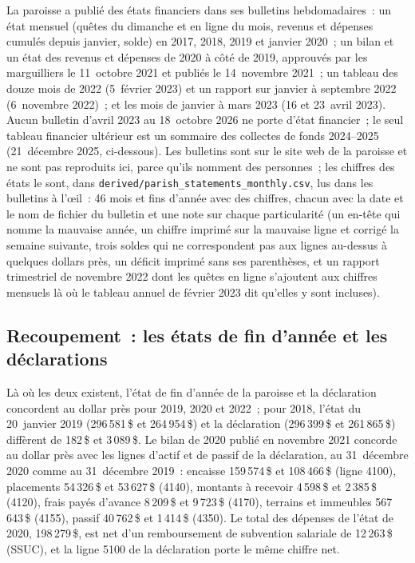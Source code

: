 \documentclass[11pt,letterpaper]{article}
\newcommand{\D}[1]{#1\,\$}
\begin{document}
La paroisse a publié des états financiers dans ses bulletins hebdomadaires~: un état mensuel (quêtes du dimanche et en ligne du mois, revenus et dépenses cumulés depuis janvier, solde) en 2017, 2018, 2019 et janvier 2020~; un bilan et un état des revenus et dépenses de 2020 à côté de 2019, approuvés par les marguilliers le 11~octobre 2021 et publiés le 14~novembre 2021~; un tableau des douze mois de 2022 (5~février 2023) et un rapport sur janvier à septembre 2022 (6~novembre 2022)~; et les mois de janvier à mars 2023 (16 et 23~avril 2023). Aucun bulletin d'avril 2023 au 18~octobre 2026 ne porte d'état financier~; le seul tableau financier ultérieur est un sommaire des collectes de fonds 2024--2025 (21~décembre 2025, ci-dessous). Les bulletins sont sur le site web de la paroisse et ne sont pas reproduits ici, parce qu'ils nomment des personnes~; les chiffres des états le sont, dans \texttt{derived/parish\_statements\_monthly.csv}, lus dans les bulletins à l'œil~: 46 mois et fins d'année avec des chiffres, chacun avec la date et le nom de fichier du bulletin et une note sur chaque particularité (un en-tête qui nomme la mauvaise année, un chiffre imprimé sur la mauvaise ligne et corrigé la semaine suivante, trois soldes qui ne correspondent pas aux lignes au-dessus à quelques dollars près, un déficit imprimé sans ses parenthèses, et un rapport trimestriel de novembre 2022 dont les quêtes en ligne s'ajoutent aux chiffres mensuels là où le tableau annuel de février 2023 dit qu'elles y sont incluses).

\subsection{Recoupement~: les états de fin d'année et les déclarations}

\begin{center}\small\end{center}

Là où les deux existent, l'état de fin d'année de la paroisse et la déclaration concordent au dollar près pour 2019, 2020 et 2022~; pour 2018, l'état du 20~janvier 2019 (\D{296\,581} et \D{264\,954}) et la déclaration (\D{296\,399} et \D{261\,865}) diffèrent de \D{182} et \D{3\,089}. Le bilan de 2020 publié en novembre 2021 concorde au dollar près avec les lignes d'actif et de passif de la déclaration, au 31~décembre 2020 comme au 31~décembre 2019~: encaisse \D{159\,574} et \D{108\,466} (ligne 4100), placements \D{54\,326} et \D{53\,627} (4140), montants à recevoir \D{4\,598} et \D{2\,385} (4120), frais payés d'avance \D{8\,209} et \D{9\,723} (4170), terrains et immeubles \D{567\,643} (4155), passif \D{40\,762} et \D{1\,414} (4350). Le total des dépenses de l'état de 2020, \D{198\,279}, est net d'un remboursement de subvention salariale de \D{12\,263} (SSUC), et la ligne 5100 de la déclaration porte le même chiffre net.
\end{document}
